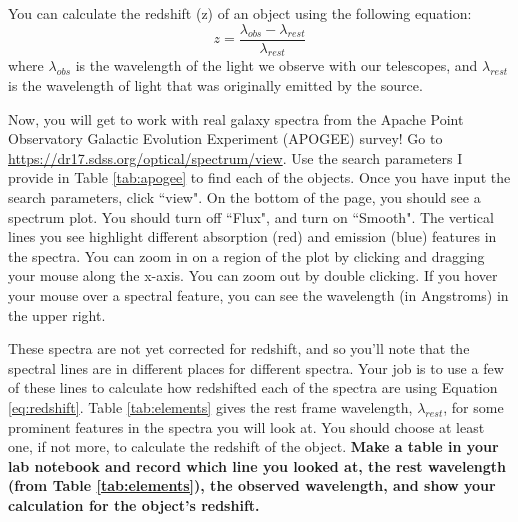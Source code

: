 \documentclass[11pt]{article}
\begin{document}
\medskip \noindent
You can calculate the redshift (z) of an object using the following equation:
\begin{equation} \label{eq:redshift}
    z = \frac{\lambda_{obs}-\lambda_{rest}}{\lambda_{rest}}
\end{equation}
\noindent
where $\lambda_{obs}$ is the wavelength of the light we observe with our telescopes, and $\lambda_{rest}$ is the wavelength of light that was originally emitted by the source.

\medskip \noindent
Now, you will get to work with real galaxy spectra from the Apache Point Observatory Galactic Evolution Experiment (APOGEE) survey! Go to \url{https://dr17.sdss.org/optical/spectrum/view}.  Use the search parameters I provide in Table \ref{tab:apogee} to find each of the objects. Once you have input the search parameters, click ``view". On the bottom of the page, you should see a spectrum plot.  You should turn off ``Flux", and turn on ``Smooth".  The vertical lines you see highlight different absorption (red) and emission (blue) features in the spectra.  You can zoom in on a region of the plot by clicking and dragging your mouse along the x-axis. You can zoom out by double clicking. If you hover your mouse over a spectral feature, you can see the wavelength (in Angstroms) in the upper right.

\medskip \noindent
These spectra  are not yet corrected for redshift, and so you'll note that the spectral lines are in different places for different spectra.  Your job is to use a few of these lines to calculate how redshifted each of the spectra are using Equation \ref{eq:redshift}. Table \ref{tab:elements} gives the rest frame wavelength, $\lambda_{rest}$, for some prominent features in the spectra you will look at.  You should choose at least one, if not more, to calculate the redshift of the object. \textbf{Make a table in your lab notebook and record which line you looked at, the rest wavelength (from Table \ref{tab:elements}), the observed wavelength, and show your calculation for the object's redshift.}
\end{document}
